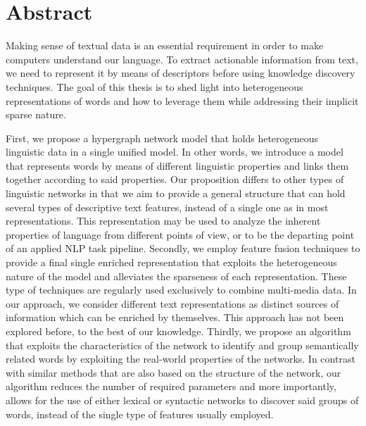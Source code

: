 \documentclass[a4paper,11pt,twoside]{ThesisStyle}
\begin{document}

\chapter*{Abstract}
Making sense of textual data is an essential requirement in order to make computers understand our language. To extract actionable information from text, we need to represent it by means of descriptors before using knowledge discovery techniques. The goal of this thesis is to shed light into heterogeneous representations of words and how to leverage them  while addressing their implicit sparse nature.

First, we  propose a hypergraph network model that holds heterogeneous linguistic data in a single unified model. In other words, we introduce a model that represents words by means of different linguistic properties and links them together according to said properties. Our proposition differs to other types of linguistic networks in that we aim to provide a general structure that can hold several types of descriptive text features, instead of a single one as in most representations. This representation may be used to analyze the inherent properties of language from different points of view, or to be the departing point of an applied NLP task pipeline. Secondly, we employ feature fusion techniques to provide a final single enriched representation that exploits the heterogeneous nature of the model and alleviates the sparseness of each representation.
These type of techniques are regularly used exclusively to combine multi-media data. In our approach, we consider different text representations as distinct sources of information which can be enriched by themselves. This approach has not been explored before, to the best of our knowledge.
Thirdly, we propose an algorithm that exploits the characteristics of the network to identify and group semantically related words by exploiting the real-world properties of the networks. In contrast with similar methods that are also based on the structure of the network, our algorithm reduces the number of required parameters and more importantly, allows for the use of either lexical or syntactic networks to discover said groups of words, instead of the single type of features usually employed.
\end{document}
